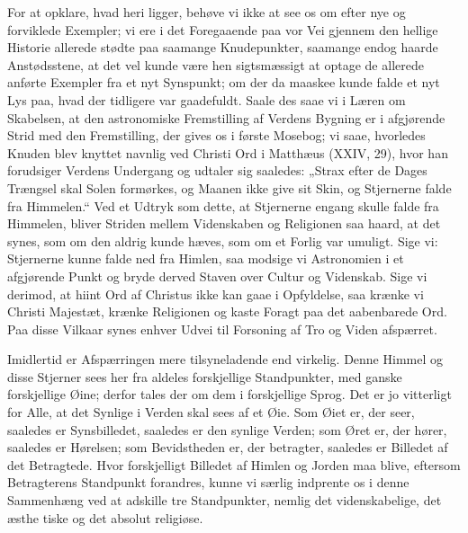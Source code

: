 \documentclass[12pt]{book}
\newcommand{\opage}[1]{\marginnote{\footnotesize\textit{[#1]}}}
\begin{document}
\opage{197}\setcounter{footnote}{0}%
For at opklare, hvad heri ligger, behøve vi ikke at
see os om efter nye og forviklede Exempler; vi ere i
det Foregaaende paa vor Vei gjennem den hellige Historie
allerede stødte paa saamange Knudepunkter, saamange
endog haarde Anstødsstene, at det vel kunde være hen\-%
sigtsmæssigt at optage de allerede anførte Exempler fra
et nyt Synspunkt; om der da maaskee kunde falde et
nyt Lys paa, hvad der tidligere var gaadefuldt. Saale\-%
des saae vi i Læren om Skabelsen, at den astronomiske
Fremstilling af Verdens Bygning er i afgjørende Strid
med den Fremstilling, der gives os i første Mosebog;
vi saae, hvorledes Knuden blev knyttet navnlig ved
Christi Ord i Matthæus (XXIV, 29), hvor han forudsiger
Verdens Undergang og udtaler sig saaledes: „Strax efter
de Dages Trængsel skal Solen formørkes, og Maanen ikke
give sit Skin, og Stjernerne falde fra Himmelen.“ Ved
et Udtryk som dette, at Stjernerne engang skulle falde
fra Himmelen, bliver Striden mellem Videnskaben og
Religionen saa haard, at det synes, som om den aldrig
kunde hæves, som om et Forlig var umuligt. Sige vi:
Stjernerne kunne falde ned fra Himlen, saa modsige vi
Astronomien i et afgjørende Punkt og bryde derved
Staven over Cultur og Videnskab. Sige vi derimod, at
hiint Ord af Christus ikke kan gaae i Opfyldelse, saa
krænke vi Christi Majestæt, krænke Religionen og kaste
Foragt paa det aabenbarede Ord. Paa disse Vilkaar
synes enhver Udvei til Forsoning af Tro og Viden
afspærret.

Imidlertid er Afspærringen mere tilsyneladende end
virkelig. Denne Himmel og disse Stjerner sees her fra
aldeles forskjellige Standpunkter, med ganske forskjellige
Øine; derfor tales der om dem i forskjellige Sprog.
Det er jo vitterligt for Alle, at det Synlige i Verden
skal sees af et Øie. Som Øiet er, der seer, saaledes er
\opage{198}\setcounter{footnote}{0}%
Synsbilledet, saaledes er den synlige Verden; som Øret
er, der hører, saaledes er Hørelsen; som Bevidstheden
er, der betragter, saaledes er Billedet af det Betragtede.
Hvor forskjelligt Billedet af Himlen og Jorden maa blive,
eftersom Betragterens Standpunkt forandres, kunne vi
særlig indprente os i denne Sammenhæng ved at adskille
tre Standpunkter, nemlig det videnskabelige, det æsthe\-%
tiske og det absolut religiøse.
\end{document}
